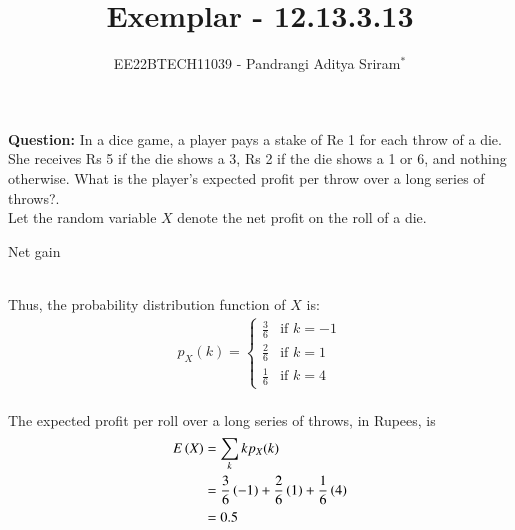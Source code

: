 \documentclass[journal,12pt,twocolumn]{IEEEtran}
\theoremstyle{remark}
\begin{document}

\vspace{3cm}

\title{Exemplar - 12.13.3.13}
\author{EE22BTECH11039 - Pandrangi Aditya Sriram$^{*}$%
}
\maketitle
\newpage
\bigskip

\renewcommand{\thefigure}{\theenumi}
\renewcommand{\thetable}{\theenumi}


\vspace{3cm}
\textbf{Question:} In a dice game, a player pays a stake of Re 1 for each throw of a die. She receives Rs 5 if the die shows a 3, Rs 2 if the die shows a 1 or 6, and nothing otherwise. What is the player’s expected profit per throw over a long series of throws?.\\
\solution
Let the random variable $X$ denote the net profit on the roll of a die.
\begin{table}[h!]
    
    \caption{Net gain}
    \label{tab:12_13_3_13}
\end{table}\\
Thus, the probability distribution function of $X$ is:
\begin{align}
    p_X(k) = 
    \begin{cases}
        \frac{3}{6} & \text{if } k = -1\\
        \frac{2}{6} & \text{if } k = 1\\
        \frac{1}{6} & \text{if } k = 4
    \end{cases}
\end{align}\\
The expected profit per roll over a long series of throws, in Rupees, is
\begin{align}
    E\left(X\right) &= \sum_{k} k p_X(k) \\
    &= \frac{3}{6}\left(-1\right) + \frac{2}{6}\left(1\right) + \frac{1}{6}\left(4\right)\\
    &= 0.5
\end{align}
\end{document}
